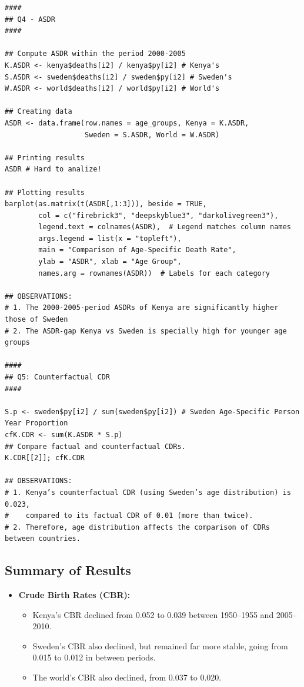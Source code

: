 \documentclass[12pt]{article}
\begin{document}
{\begin{verbatim}
####
## Q4 - ASDR
####

## Compute ASDR within the period 2000-2005
K.ASDR <- kenya$deaths[i2] / kenya$py[i2] # Kenya's
S.ASDR <- sweden$deaths[i2] / sweden$py[i2] # Sweden's
W.ASDR <- world$deaths[i2] / world$py[i2] # World's

## Creating data
ASDR <- data.frame(row.names = age_groups, Kenya = K.ASDR, 
                   Sweden = S.ASDR, World = W.ASDR) 

## Printing results
ASDR # Hard to analize!

## Plotting results
barplot(as.matrix(t(ASDR[,1:3])), beside = TRUE, 
        col = c("firebrick3", "deepskyblue3", "darkolivegreen3"),
        legend.text = colnames(ASDR),  # Legend matches column names
        args.legend = list(x = "topleft"),
        main = "Comparison of Age-Specific Death Rate",
        ylab = "ASDR", xlab = "Age Group",
        names.arg = rownames(ASDR))  # Labels for each category

## OBSERVATIONS:
# 1. The 2000-2005-period ASDRs of Kenya are significantly higher those of Sweden
# 2. The ASDR-gap Kenya vs Sweden is specially high for younger age groups

####
## Q5: Counterfactual CDR
####

S.p <- sweden$py[i2] / sum(sweden$py[i2]) # Sweden Age-Specific Person Year Proportion
cfK.CDR <- sum(K.ASDR * S.p)
## Compare factual and counterfactual CDRs.
K.CDR[[2]]; cfK.CDR

## OBSERVATIONS:
# 1. Kenya’s counterfactual CDR (using Sweden’s age distribution) is 0.023, 
#    compared to its factual CDR of 0.01 (more than twice). 
# 2. Therefore, age distribution affects the comparison of CDRs between countries.
\end{verbatim}

\subsection*{Summary of Results}
\begin{itemize}
    \item \textbf{Crude Birth Rates (CBR):} 
    \begin{itemize}
        \item Kenya’s CBR declined from 0.052 to 0.039 between 1950–1955 and 2005–2010.
        \item Sweden’s CBR also declined, but remained far more stable, going from 0.015 to 0.012 in between periods.
        \item The world’s CBR also declined, from 0.037 to 0.020.
    \end{itemize}


\end{itemize}}
\end{document}
